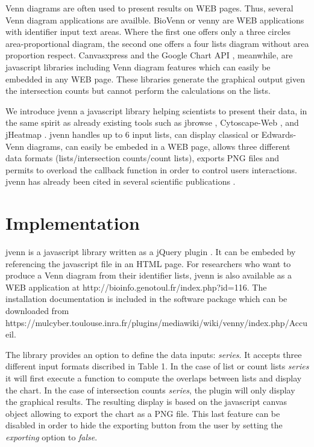 \documentclass{bmcart}
\begin{document}
Venn diagrams are often used to present results on WEB pages. Thus, several Venn diagram applications are 
availble. BioVenn \cite{Hulsen2008} or venny \cite{venny} are WEB applications with identifier input text 
areas. Where the first one offers only a three circles area-proportional diagram, the second one offers a 
four lists diagram without area proportion respect. Canvasxpress \cite{canvasxpress} and the Google Chart 
API \cite{googleAPI}, meanwhile, are javascript libraries including Venn diagram features which can easily 
be embedded in any WEB page. These libraries generate the graphical output given the intersection counts but 
cannot perform the calculations on the lists.

We introduce jvenn a javascript library helping scientists to present their data, in the same spirit as already 
existing tools such as jbrowse \cite{Westesson01032013}, Cytoscape-Web \cite{Lopes2010}, and jHeatmap \cite{DeuPons2014}. 
jvenn handles up to 6 input lists, can display classical or Edwards-Venn \cite{Edwards2004} diagrams, can easily be 
embeded in a WEB page, allows three different data formats (lists/intersection counts/count lists), exports PNG files and permits 
to overload the callback function in order to control users interactions. jvenn has already been cited in several scientific 
publications \cite{Bianchia2013, Aravindraja2013}.


\section*{Implementation}

jvenn is a javascript library written as a jQuery plugin \cite{jquery}. It can be embeded by referencing the javascript file 
in an HTML page. For researchers who want to produce a Venn diagram from their identifier lists, jvenn is also available as a 
WEB application at http://bioinfo.genotoul.fr/index.php?id=116. The installation documentation is included in the software package 
which can be downloaded from https://mulcyber.toulouse.inra.fr/plugins/mediawiki/wiki/venny/index.php/Accueil.

The library provides an option to define the data inputs: \textit{series}. It accepts three different input formats discribed in 
Table 1. In the case of list or count lists \textit{series} it will first execute a function to compute the overlaps between lists and
display the chart. In the case of intersection counts \textit{series}, the plugin will only display the graphical results. The resulting 
display is based on the javascript canvas object allowing to export the chart as a PNG file. This last feature can be disabled in order 
to hide the exporting button from the user by setting the \textit{exporting} option to \textit{false}.
\end{document}
